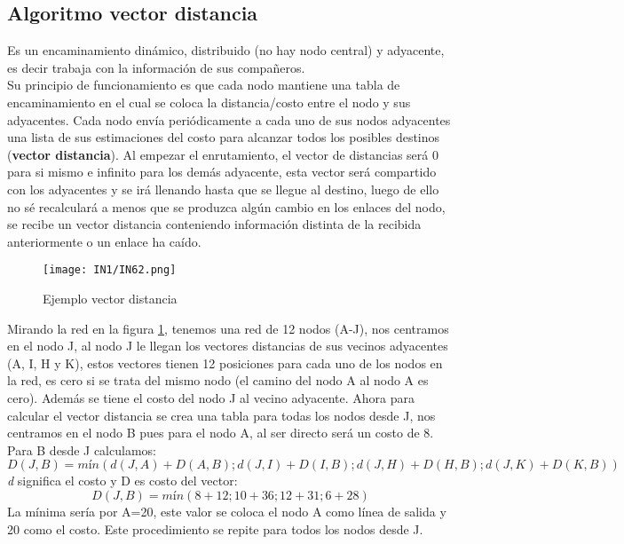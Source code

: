 \documentclass[
	12pt, %
	fleqn, %
	a4paper, %
]{LegrandOrangeBook}
\begin{document}
\subsection{Algoritmo vector distancia}
Es un encaminamiento dinámico, distribuido (no hay nodo central) y adyacente, es decir trabaja con la información de sus compañeros.\\
Su principio de funcionamiento es que cada nodo mantiene una tabla de encaminamiento en el cual se coloca la distancia/costo entre el nodo y sus adyacentes. Cada nodo envía periódicamente a cada uno de sus nodos adyacentes una lista de sus estimaciones del costo para alcanzar todos los posibles destinos (\textbf{vector distancia}). Al empezar el enrutamiento, el vector de distancias será 0 para si mismo e infinito para los demás adyacente, esta vector será compartido con los adyacentes y se irá llenando hasta que se llegue al destino, luego de ello no sé recalculará a menos que se produzca algún cambio en los enlaces del nodo, se recibe un vector distancia conteniendo información distinta de la recibida anteriormente o un enlace ha caído.
\begin{figure}[H]
\centering
\texttt{[image: IN1/IN62.png]}
\caption{Ejemplo vector distancia}
\label{fig:ejemplo vec dist}
\end{figure}
Mirando la red en la figura \ref{fig:ejemplo vec dist}, tenemos una red de 12 nodos (A-J), nos centramos en el nodo J, al nodo J le llegan los vectores distancias de sus vecinos adyacentes (A, I, H y K), estos vectores tienen 12 posiciones para cada uno de los nodos en la red, es cero si se trata del mismo nodo (el camino del nodo A al nodo A es cero). Además se tiene el costo del nodo J al vecino adyacente. Ahora para calcular el vector distancia se crea una tabla para todas los nodos desde J, nos centramos en el nodo B pues para el nodo A, al ser directo será un costo de 8. Para B desde J calculamos:
\begin{displaymath}
D(J,B)=mín(d(J,A)+D(A,B);d(J,I)+D(I,B);d(J,H)+D(H,B);d(J,K)+D(K,B))
\end{displaymath}
\textit{d} significa el costo y D es costo del vector:
\begin{displaymath}
D(J,B)=mín(8+12;10+36;12+31;6+28)
\end{displaymath}
La mínima sería por A=20, este valor se coloca el nodo A como línea de salida y 20 como el costo. Este procedimiento se repite para todos los nodos desde J.\\
\end{document}
